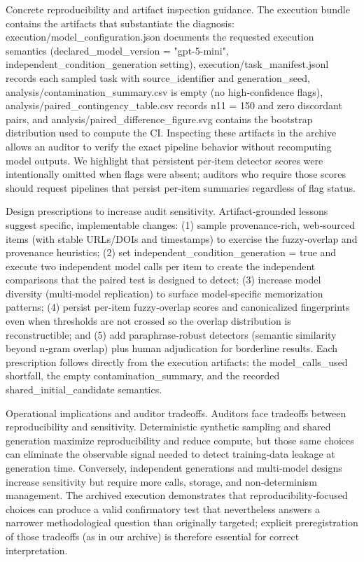 \documentclass[conference]{IEEEtran}
\begin{document}
Concrete reproducibility and artifact inspection guidance. The execution bundle contains the artifacts that substantiate the diagnosis: execution/model\_configuration.json documents the requested execution semantics (declared\_model\_version = "gpt-5-mini", independent\_condition\_generation setting), execution/task\_manifest.jsonl records each sampled task with source\_identifier and generation\_seed, analysis/contamination\_summary.csv is empty (no high‑confidence flags), analysis/paired\_contingency\_table.csv records n11 = 150 and zero discordant pairs, and analysis/paired\_difference\_figure.svg contains the bootstrap distribution used to compute the CI. Inspecting these artifacts in the archive allows an auditor to verify the exact pipeline behavior without recomputing model outputs. We highlight that persistent per‑item detector scores were intentionally omitted when flags were absent; auditors who require those scores should request pipelines that persist per‑item summaries regardless of flag status.

Design prescriptions to increase audit sensitivity. Artifact‑grounded lessons suggest specific, implementable changes: (1) sample provenance‑rich, web‑sourced items (with stable URLs/DOIs and timestamps) to exercise the fuzzy‑overlap and provenance heuristics; (2) set independent\_condition\_generation = true and execute two independent model calls per item to create the independent comparisons that the paired test is designed to detect; (3) increase model diversity (multi‑model replication) to surface model‑specific memorization patterns; (4) persist per‑item fuzzy‑overlap scores and canonicalized fingerprints even when thresholds are not crossed so the overlap distribution is reconstructible; and (5) add paraphrase‑robust detectors (semantic similarity beyond n‑gram overlap) plus human adjudication for borderline results. Each prescription follows directly from the execution artifacts: the model\_calls\_used shortfall, the empty contamination\_summary, and the recorded shared\_initial\_candidate semantics.

Operational implications and auditor tradeoffs. Auditors face tradeoffs between reproducibility and sensitivity. Deterministic synthetic sampling and shared generation maximize reproducibility and reduce compute, but those same choices can eliminate the observable signal needed to detect training‑data leakage at generation time. Conversely, independent generations and multi‑model designs increase sensitivity but require more calls, storage, and non‑determinism management. The archived execution demonstrates that reproducibility‑focused choices can produce a valid confirmatory test that nevertheless answers a narrower methodological question than originally targeted; explicit preregistration of those tradeoffs (as in our archive) is therefore essential for correct interpretation.
\end{document}
